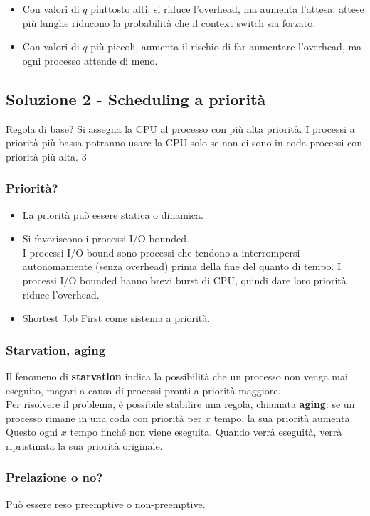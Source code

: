 \documentclass{report}
\begin{document}
\begin{itemize}
    \item Con valori di $q$ piuttosto alti, si riduce l'overhead, ma aumenta l'attesa: attese più lunghe riducono la probabilità che il context switch sia forzato.

    \item Con valori di $q$ più piccoli, aumenta il rischio di far aumentare l'overhead, ma ogni processo attende di meno.
\end{itemize}

\subsection{Soluzione 2 - Scheduling a priorità}
Regola di base? Si assegna la CPU al processo con più alta priorità. I processi a priorità più bassa potranno usare la CPU solo se non ci sono in coda processi con priorità più alta.
3
\subsubsection{Priorità?}
\begin{itemize}
    \item La priorità può essere statica o dinamica.
    \item Si favoriscono i processi I/O bounded.\\
    I processi I/O bound sono processi che tendono a interrompersi autonomamente (senza overhead) prima della fine del quanto di tempo. I processi I/O bounded hanno brevi burst di CPU, quindi dare loro priorità riduce l'overhead.
    \item Shortest Job First come sistema a priorità.
\end{itemize}

\subsubsection{Starvation, aging}
Il fenomeno di \textbf{starvation} indica la possibilità che un processo non venga mai eseguito, magari a causa di processi pronti a priorità maggiore.\\ Per risolvere il problema, è possibile stabilire una regola, chiamata \textbf{aging}: se un processo rimane in una coda con priorità per $x$ tempo, la sua priorità aumenta. Questo ogni $x$ tempo finché non viene eseguita. Quando verrà eseguità, verrà ripristinata la sua priorità originale.

\subsubsection{Prelazione o no?}
Può essere reso preemptive o non-preemptive.
\end{document}
